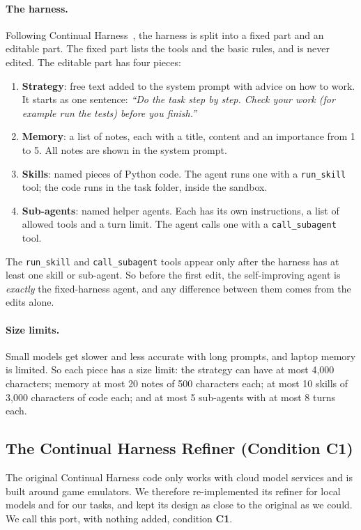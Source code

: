 \paragraph{The harness.}
Following Continual Harness~\cite{karten2026continual}, the harness is split into a fixed part and
an editable part. The fixed part lists the tools and the basic rules, and is never edited. The
editable part has four pieces:
\begin{enumerate}
  \item \textbf{Strategy}: free text added to the system prompt with advice on how to work. It
        starts as one sentence: \emph{``Do the task step by step. Check your work (for example run
        the tests) before you finish.''}
  \item \textbf{Memory}: a list of notes, each with a title, content and an importance from 1 to 5.
        All notes are shown in the system prompt.
  \item \textbf{Skills}: named pieces of Python code. The agent runs one with a \texttt{run\_skill}
        tool; the code runs in the task folder, inside the sandbox.
  \item \textbf{Sub-agents}: named helper agents. Each has its own instructions, a list of allowed
        tools and a turn limit. The agent calls one with a \texttt{call\_subagent} tool.
\end{enumerate}
The \texttt{run\_skill} and \texttt{call\_subagent} tools appear only after the harness has at
least one skill or sub-agent. So before the first edit, the self-improving agent is \emph{exactly}
the fixed-harness agent, and any difference between them comes from the edits alone.

\paragraph{Size limits.}
Small models get slower and less accurate with long prompts, and laptop memory is limited. So each
piece has a size limit: the strategy can have at most 4{,}000 characters; memory at most 20 notes
of 500 characters each; at most 10 skills of 3{,}000 characters of code each; and at most 5
sub-agents with at most 8 turns each.

\subsection{The Continual Harness Refiner (Condition C1)}
\label{sec:refiner}

The original Continual Harness code only works with cloud model services and is built around game
emulators. We therefore re-implemented its refiner for local models and for our tasks, and kept
its design as close to the original as we could. We call this port, with nothing added,
condition \textbf{C1}.

